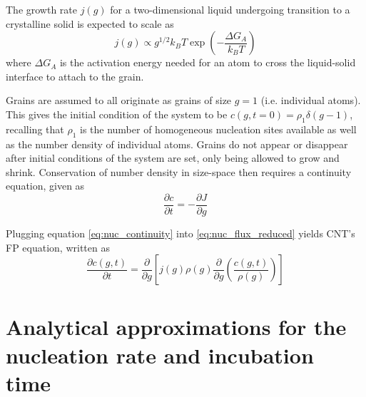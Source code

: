 The growth rate $j(g)$ for a two-dimensional liquid undergoing transition to a crystalline solid is expected to scale as \cite{turnbull49}
\begin{equation}\label{eq:nuc_attachmentrate}
j(g) \propto g^{1/2} k_B T \exp\left(-\frac{\Delta G_A}{k_B T}\right)
\end{equation}
where $\Delta G_A$ is the activation energy needed for an atom to cross the liquid-solid interface to attach to the grain. %

Grains are assumed to all originate as grains of size $g=1$ (i.e. individual atoms). This gives the initial condition of the system to be $c(g,t=0)=\rho_1\delta(g-1)$, recalling that $\rho_1$ is the number of homogeneous nucleation sites available as well as the number density of individual atoms. Grains do not appear or disappear after initial conditions of the system are set, only being allowed to grow and shrink. Conservation of number density in size-space then requires a continuity equation, given as
\begin{equation}\label{eq:nuc_continuity}
\frac{\partial c}{\partial t}=-\frac{\partial J}{\partial g}
\end{equation}

Plugging equation \ref{eq:nuc_continuity} into \ref{eq:nuc_flux_reduced} yields CNT's FP equation, written as
\begin{equation}\label{eq:nuc_fopl}
\frac{\partial c(g,t)}{\partial t}=\frac{\partial}{\partial g}\left[j(g)\rho(g)\frac{\partial}{\partial g}\left(\frac{c(g,t)}{\rho(g)}\right)\right]
\end{equation}

\section{Analytical approximations for the nucleation rate and incubation time}\label{sec:nuc_fopl_sol}


